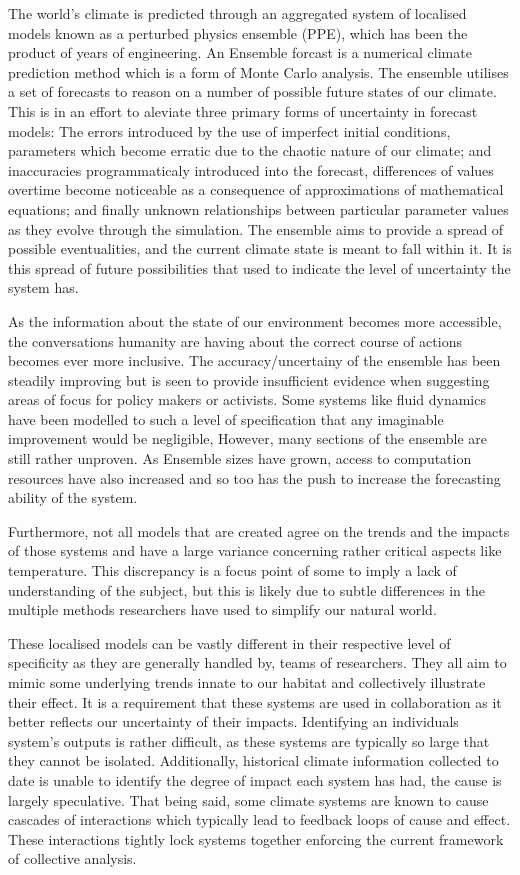 \documentclass{ecmm427_assignment}
\begin{document}
 The world's climate is predicted through an aggregated system of localised models known as a perturbed physics ensemble (PPE), which has been the product of years of engineering. An Ensemble forcast is a numerical climate prediction method which is a form of Monte Carlo analysis. The ensemble utilises a set of forecasts to reason on a number of possible future states of our climate. This is in an effort to aleviate three primary forms of uncertainty in forecast models: The errors introduced by the use of imperfect initial conditions, parameters which become erratic due to the chaotic nature of our climate; and inaccuracies programmaticaly introduced into the forecast, differences of values overtime become noticeable as a consequence of approximations of mathematical equations; and finally unknown relationships between particular parameter values as they evolve through the simulation. The ensemble aims to provide a spread of possible eventualities, and the current climate state is meant to fall within it. It is this spread of future possibilities that used to indicate the level of uncertainty the system has.

As the information about the state of our environment becomes more accessible, the conversations humanity are having about the correct course of actions becomes ever more inclusive. The accuracy/uncertainy of the ensemble has been steadily improving but is seen to provide insufficient evidence when suggesting areas of focus for policy makers or activists. Some systems like fluid dynamics have been modelled to such a level of specification that any imaginable improvement would be negligible, However, many sections of the ensemble are still rather unproven. As Ensemble sizes have grown, access to computation resources have also increased and so too has the push to increase the forecasting ability of the system.
 
Furthermore, not all models that are created agree on the trends and the impacts of those systems and have a large variance concerning rather critical aspects like temperature. This discrepancy is a focus point of some to imply a lack of understanding of the subject, but this is likely due to subtle differences in the multiple methods researchers have used to simplify our natural world. 

These localised models can be vastly different in their respective level of specificity as they are generally handled by,  teams of researchers. They all aim to mimic some underlying trends innate to our habitat and collectively illustrate their effect. It is a requirement that these systems are used in collaboration as it better reflects our uncertainty of their impacts. Identifying an individuals system's outputs is rather difficult, as these systems are typically so large that they cannot be isolated. Additionally, historical climate information collected to date is unable to identify the degree of impact each system has had, the cause is largely speculative. That being said, some climate systems are known to cause cascades of interactions which typically lead to feedback loops of cause and effect. These interactions tightly lock systems together enforcing the current framework of collective analysis.
\end{document}
